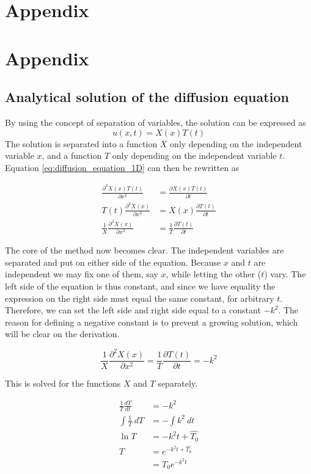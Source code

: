 \documentclass[12pt]{extarticle}
\begin{document}
\section{Appendix}

\section*{Appendix}

\subsection*{Analytical solution of the diffusion equation}
By using the concept of separation of variables, the solution can be expressed as
\[ u(x,t) = X(x)T(t) \]
The solution is separated into a function $X$ only depending on the independent variable $x$, and a function $T$ only depending on the independent variable $t$. Equation \eqref{eq:diffusion_equation_1D} can then be rewritten as

\begin{align*}
	\frac{\partial^2 X(x)T(t)}{\partial x^2} &= \frac{\partial X(x)T(t)}{\partial t} \\
	T(t)\frac{\partial^2 X(x)}{\partial x^2} &= X(x)\frac{\partial T(t)}{\partial t} \\
	\frac{1}{X}\frac{\partial^2 X(x)}{\partial x^2} &= \frac{1}{T}\frac{\partial T(t)}{\partial t}
\end{align*}

The core of the method now becomes clear. The independent variables are separated and put on either side of the equation. Because $x$ and $t$ are independent we may fix one of them, say $x$, while letting the other ($t$) vary. The left side of the equation is thus constant, and since we have equality the expression on the right side must equal the same constant, for arbitrary $t$. Therefore, we can set the left side and right side equal to a constant $-k^2$. The reason for defining a negative constant is to prevent a growing solution, which will be clear on the derivation.

\[ \frac{1}{X}\frac{\partial^2 X(x)}{\partial x^2} = \frac{1}{T}\frac{\partial T(t)}{\partial t} = -k^2\]

This is solved for the functions $X$ and $T$ separately. 

\begin{align*}
	\frac{1}{T} \frac{dT}{dt} &= -k^2 \\
	\int \frac{1}{T}\:dT &= -\int k^2\:dt \\
	\ln T &= -k^2 t + \hat{T_0} \\
	T &= e^{-k^2t + \hat{T_0}} \\
	&= T_0 e^{-k^2t}
\end{align*}
\end{document}
